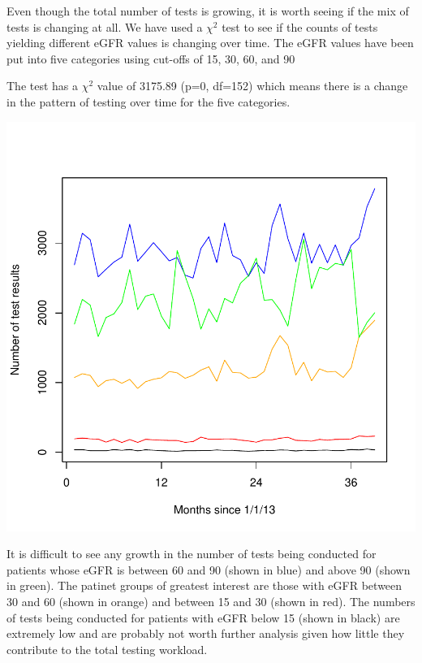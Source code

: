 

Even though the total number of tests is growing, it is worth seeing if the mix of tests is changing at all. We have used a $\chi^2$ test to see if the counts of tests yielding different eGFR values is changing over time. The eGFR values have been put into five categories using cut-offs of 15, 30, 60, and 90

\begin{Schunk}
\begin{Soutput}
'data.frame':	195 obs. of  5 variables:
 $ X     : Factor w/ 195 levels "1","10","100",..: 1 108 119 130 141 152 163 174 185 2 ...
 $ Year  : Factor w/ 4 levels "2013","2014",..: 1 1 1 1 1 1 1 1 1 1 ...
 $ Month : Factor w/ 12 levels "1","10","11",..: 1 1 1 1 1 5 5 5 5 5 ...
 $ EGFR_G: Factor w/ 5 levels "(-1,15]","(15,30]",..: 1 2 3 4 5 1 2 3 4 5 ...
 $ n     : num  37 193 1073 2690 1838 ...
\end{Soutput}
\end{Schunk}

The test has a $\chi^2$ value of 3175.89 (p=0, df=152) which means there is a change in the pattern of testing over time for the five categories.

\includegraphics{Figures/Monthly-LinePlots}

It is difficult to see any growth in the number of tests being conducted for patients whose eGFR is between 60 and 90 (shown in blue) and above 90 (shown in green). The patinet groups of greatest interest are those with eGFR between 30 and 60 (shown in orange) and between 15 and 30 (shown in red). The numbers of tests being conducted for patients with eGFR below 15 (shown in black) are extremely low and are probably not worth further analysis given how little they contribute to  the total testing workload. 
